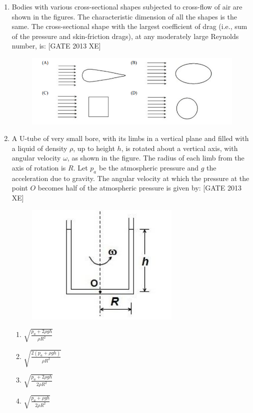 \documentclass[journal,12pt,onecolumn]{IEEEtran}
\theoremstyle{remark}
\begin{document}
\begin{enumerate}
\item Bodies with various cross-sectional shapes subjected to cross-flow of air are shown in the figures. The characteristic dimension of all the shapes is the same. The cross-sectional shape with the largest coefficient of drag (i.e., sum of the pressure and skin-friction drags), at any moderately large Reynolds number, is: \hfill[GATE 2013 XE]
\begin{figure}[H]
    \centering
    \includegraphics[width=0.5\columnwidth]{figs/fig2.png}
    \caption{}
    \label{fig:fig2}
\end{figure}

\item A U-tube of very small bore, with its limbs in a vertical plane and filled with a liquid of density $\rho$, up to height $h$, is rotated about a vertical axis, with angular velocity $\omega$, as shown in the figure. The radius of each limb from the axis of rotation is $R$. Let $p_a$ be the atmospheric pressure and $g$ the acceleration due to gravity. The angular velocity at which the pressure at the point $O$ becomes half of the atmospheric pressure is given by: \hfill[GATE 2013 XE]

\begin{figure}[H]
    \centering
    \includegraphics[width=0.5\columnwidth]{figs/fig3.png}
    \caption{}
    \label{fig:fig3}
\end{figure}
\begin{multicols}{4}
\begin{enumerate}
\item $\sqrt{\frac{p_a+2\rho gh}{\rho R^2}}$
\item $\sqrt{\frac{2(p_a+\rho gh)}{\rho R^2}}$
\item $\sqrt{\frac{p_a+2\rho gh}{2\rho R^2}}$
\item $\sqrt{\frac{p_a+\rho gh}{2\rho R^2}}$
\end{enumerate}
\end{multicols}


\end{enumerate}
\end{document}
